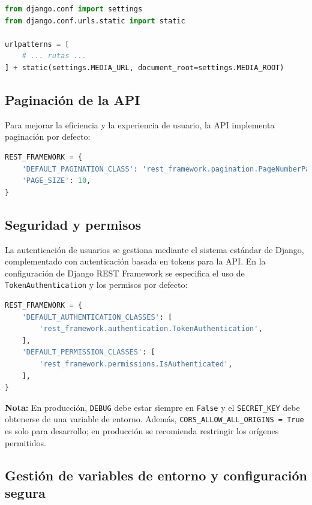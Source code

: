 \begin{lstlisting}[language=Python, caption={Configuración de media en urls.py}]
from django.conf import settings
from django.conf.urls.static import static

urlpatterns = [
    # ... rutas ...
] + static(settings.MEDIA_URL, document_root=settings.MEDIA_ROOT)
\end{lstlisting}

\subsection{Paginación de la API}

Para mejorar la eficiencia y la experiencia de usuario, la API implementa paginación por defecto:

\begin{lstlisting}[language=Python, caption={Paginación en settings.py}]
REST_FRAMEWORK = {
    'DEFAULT_PAGINATION_CLASS': 'rest_framework.pagination.PageNumberPagination',
    'PAGE_SIZE': 10,
}
\end{lstlisting}

\subsection{Seguridad y permisos}

La autenticación de usuarios se gestiona mediante el sistema estándar de Django, complementado con autenticación basada en tokens para la API. En la configuración de Django REST Framework se especifica el uso de \texttt{TokenAuthentication} y los permisos por defecto:

\begin{lstlisting}[language=Python, caption={Configuración de autenticación y permisos}]
REST_FRAMEWORK = {
    'DEFAULT_AUTHENTICATION_CLASSES': [
        'rest_framework.authentication.TokenAuthentication',
    ],
    'DEFAULT_PERMISSION_CLASSES': [
        'rest_framework.permissions.IsAuthenticated',
    ],
}
\end{lstlisting}

\textbf{Nota:} En producción, \texttt{DEBUG} debe estar siempre en \texttt{False} y el \texttt{SECRET\_KEY} debe obtenerse de una variable de entorno. Además, \texttt{CORS\_ALLOW\_ALL\_ORIGINS = True} es solo para desarrollo; en producción se recomienda restringir los orígenes permitidos.

\subsection{Gestión de variables de entorno y configuración segura}

